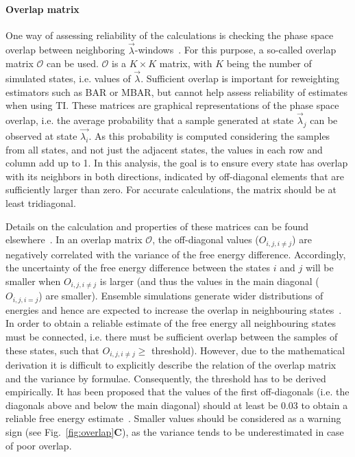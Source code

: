 \documentclass[9pt,bestpractices]{livecoms}
\begin{document}
\paragraph{Overlap matrix}
One way of assessing reliability of the calculations is checking the phase space overlap between neighboring $\vec{\lambda}$-windows~\cite{wu2005phasespace, wu2005phasespacea}. For this purpose, a so-called overlap matrix $\mathcal{O}$ can be used. $\mathcal{O}$ is a $K\times K$ matrix, with $K$ being the number of simulated states, i.e. values of $\vec{\lambda}$. Sufficient overlap is important for reweighting estimators such as BAR or MBAR, but cannot help assess reliability of estimates when using TI. 
These matrices are graphical representations of the phase space overlap, i.e. the average probability that a sample generated at state $\vec{\lambda}_{j}$ can be observed at state $\vec{\lambda_{i}}$. As this probability is computed considering the samples from all states, and not just the adjacent states, the values in each row and column add up to 1. In this analysis, the goal is to ensure every state has overlap with its neighbors in both directions, indicated by off-diagonal elements that are sufficiently larger than zero. For accurate calculations, the matrix should be at least tridiagonal.

Details on the calculation and properties of these matrices can be found elsewhere~\cite{klimovich2015guidelines}.
In an overlap matrix $\mathcal{O}$, the off-diagonal values (${O}_{i,j,i\ne j}$) are negatively correlated with the variance of the free energy difference. Accordingly, the uncertainty of the free energy difference between the states $i$ and $j$ will be smaller when ${O}_{i,j,i\ne j}$ is larger (and thus the values in the main diagonal (${O}_{i,j,i=j}$) are smaller). 
Ensemble simulations generate wider distributions of energies and hence are expected to increase the overlap in neighbouring states~\cite{wade2022}.
In order to obtain a reliable estimate of the free energy all neighbouring states must be connected, i.e. there must be sufficient overlap between the samples of these states, such that ${O}_{i,j,i\ne j}\ge$ threshold).
However, due to the mathematical derivation it is difficult to explicitly describe the relation of the overlap matrix and the variance by formulae. Consequently, the threshold has to be derived empirically. It has been proposed that the values of the first off-diagonals (i.e. the diagonals above and below the main diagonal) should at least be 0.03 to obtain a reliable free energy estimate~\cite{klimovich2015guidelines}. Smaller values should be considered as a warning sign (see Fig.~\ref{fig:overlap}\textbf{C}), as the variance tends to be underestimated in case of poor overlap.
\end{document}
